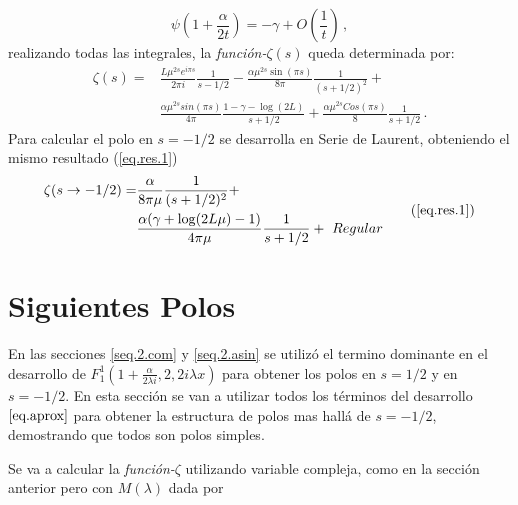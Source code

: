 \begin{equation}
    \psi(1 + \frac{\alpha}{2 t}) =
    - \gamma + O \left( \frac{1}{t} \right)
    \, ,
\end{equation}
realizando todas las integrales, la {\it función-$\zeta (s)$} queda determinada por:  
\begin{equation}
\begin{aligned}
    \zeta  (s)  = 
    & \frac{L \mu ^{2 s} e ^{i \pi s}}{2 \pi i} \frac{1}{s-1/2} 
    -\frac{\alpha \mu ^{2s} \sin(\pi s)}{8 \pi} \frac{1}{(s+1/2) ^2} + \\
    & \frac{\alpha \mu ^{2s} sin (\pi s) }{4 \pi } \frac{1 - \gamma -   \log (2 L)}{s+1/2}
    + \frac{\alpha \mu ^{2s} Cos(\pi s)}{8} \frac{1}{s+1/2}
    	\, .
\end{aligned}
\end{equation}
Para calcular el polo en $s=-1/2$ se desarrolla en Serie de Laurent, obteniendo el mismo resultado (\ref{eq.res.1})
\begin{equation}
\begin{aligned}
	\zeta (s \rightarrow -1/2) = 
    &\frac{\alpha}{8 \pi \mu } \frac{1}{(s+1/2)^2} + \\
	&\frac{\alpha ( \gamma  +  \log (2L \mu ) -1 )}{4 \pi \mu } \frac{1}{s+1/2} + \ Regular    
\end{aligned}
\tag{\ref{eq.res.1}}
\end{equation}



\section{Siguientes Polos}\label{sec.sig.polos}


En las secciones \ref{seq.2.com} y \ref{seq.2.asin} se utilizó el termino dominante en el desarrollo de $F _{1} ^{1} (1+\frac{ \alpha}{2 \lambda i },2,2 i \lambda x)$ para obtener los polos en $s=1/2$ y en $s=-1/2$. En esta sección se van a utilizar todos los términos del desarrollo $\ref{eq.aprox}$ para obtener la estructura de polos mas hallá de $s=-1/2$, demostrando que todos son polos simples. 

Se va a calcular la {\it función-$\zeta$} utilizando variable compleja, como en la sección anterior pero con $M ( \lambda )$ dada por


